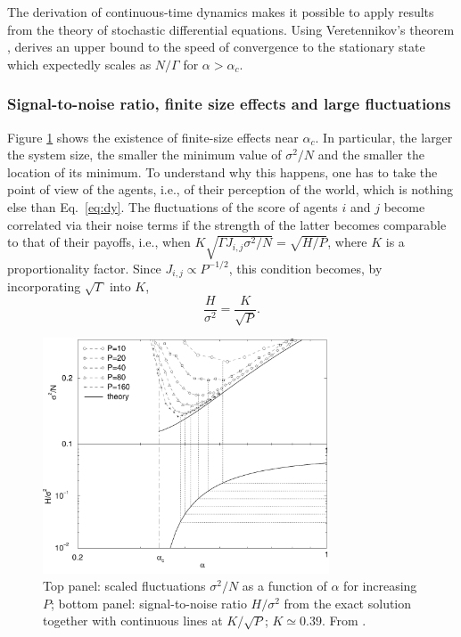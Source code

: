 \documentclass[aps,twocolumn,nofootinbib,sortedaddress,reprint]{revtex4-1}
\begin{document}
The derivation of continuous-time dynamics makes it possible to apply
results from the theory of stochastic differential equations. Using
Veretennikov's theorem \cite{veretennikov2000polynomial},
\textcite{ortisi2008polynomial} derives an upper bound to the speed of
convergence to the stationary state which expectedly scales as
$N/\Gamma$ for $\alpha>\alpha_c$.

\subsubsection{Signal-to-noise ratio, finite size effects and large fluctuations}
\label{sec:signal-noise}
Figure \ref{fig:signal-noise} shows the existence of finite-size
effects near $\alpha_c$. In particular, the larger the system size,
the smaller the minimum value of $\sigma^2/N$ and the smaller the
location of its minimum. To understand why this happens, one has to
take the point of view of the agents, i.e., of their perception of the
world, which is nothing else than Eq.\ \eqref{eq:dy}. The fluctuations
of the score of agents $i$ and $j$ become correlated via their noise
terms if the strength of the latter becomes comparable to that of their payoffs,
i.e., when $K\sqrt{\Gamma J_{i,j}\sigma^2/N}=\sqrt{H/P}$, where $K$ is
a proportionality factor. Since $J_{i,j}\propto P^ {-1/2}$, this
condition becomes, by incorporating $\sqrt{\Gamma}$ into $K$,
\begin{equation}
\frac{H}{\sigma^2}=\frac{K}{\sqrt{P}}.\label{eq:sign-noise-MG}
\end{equation}
\begin{figure}
\includegraphics*[width=8.5cm]{fig3.pdf}
\caption{\label{fig:signal-noise} Top panel: scaled fluctuations
  $\sigma^2/N$ as a function of $\alpha$ for increasing $P$; bottom
  panel: signal-to-noise ratio $H/\sigma^2$ from the exact solution
  together with continuous lines at $K/\sqrt{P}$; $K\simeq 0.39$. From
  \textcite{MGbook}.}
\end{figure}
\end{document}

